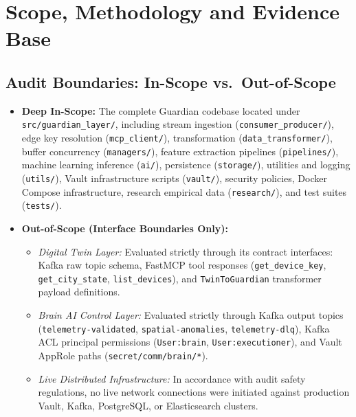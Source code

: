 \documentclass[10pt,a4paper]{report}
\begin{document}
\chapter{Scope, Methodology and Evidence Base}

\section{Audit Boundaries: In-Scope vs.\ Out-of-Scope}
\begin{itemize}[leftmargin=*]
  \item \textbf{Deep In-Scope:} The complete Guardian codebase located under \texttt{src/guardian\_layer/}, including stream ingestion (\texttt{consumer\_producer/}), edge key resolution (\texttt{mcp\_client/}), transformation (\texttt{data\_transformer/}), buffer concurrency (\texttt{managers/}), feature extraction pipelines (\texttt{pipelines/}), machine learning inference (\texttt{ai/}), persistence (\texttt{storage/}), utilities and logging (\texttt{utils/}), Vault infrastructure scripts (\texttt{vault/}), security policies, Docker Compose infrastructure, research empirical data (\texttt{research/}), and test suites (\texttt{tests/}).
  \item \textbf{Out-of-Scope (Interface Boundaries Only):}
  \begin{itemize}
    \item \textit{Digital Twin Layer:} Evaluated strictly through its contract interfaces: Kafka raw topic schema, FastMCP tool responses (\texttt{get\_device\_key}, \texttt{get\_city\_state}, \texttt{list\_devices}), and \texttt{TwinToGuardian} transformer payload definitions.
    \item \textit{Brain AI Control Layer:} Evaluated strictly through Kafka output topics (\texttt{telemetry-validated}, \texttt{spatial-anomalies}, \texttt{telemetry-dlq}), Kafka ACL principal permissions (\texttt{User:brain}, \texttt{User:executioner}), and Vault AppRole paths (\texttt{secret/comm/brain/*}).
    \item \textit{Live Distributed Infrastructure:} In accordance with audit safety regulations, no live network connections were initiated against production Vault, Kafka, PostgreSQL, or Elasticsearch clusters.
  \end{itemize}
\end{itemize}
\end{document}
